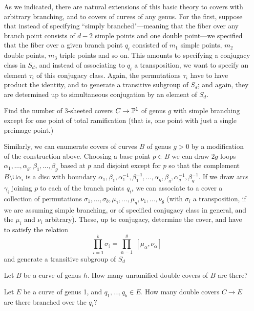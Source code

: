 As we indicated, there are natural extensions of this basic theory to covers with arbitrary branching, and to covers of curves of any genus. For the first, suppose that instead of specifying ``simply branched"---meaning that the fiber over any branch point consists of $d-2$ simple points and one double point---we specified that the fiber over a given branch point $q_i$ consisted of $m_1$ simple points, $m_2$ double points, $m_3$ triple points and so on. This amounts to specifying a conjugacy class in $S_d$, and instead of associating to $q_i$ a transposition, we want to specify an element $\tau_i$ of this conjugacy class. Again, the permutations $\tau_i$ have to have product the identity, and to generate a transitive subgroup of $S_d$; and again, they are determined up to simultaneous conjugation by an element of $S_d$.

\begin{exercise}
Find the number of 3-sheeted covers $C \to \PP^1$ of genus $g$ with simple branching except for one point of total ramification (that is, one point with just a single preimage point.)
\end{exercise}

Similarly, we can enumerate covers of curves $B$ of genus $g>0$ by a modification of the construction above. Choosing a base point $p \in B$ we can draw $2g$ loops $\alpha_1,\dots,\alpha_{g},\beta_1, \dots, \beta_g$ based at $p$ and disjoint except for $p$ so that the complement $B \setminus \cup \alpha_i$ is a disc with boundary $\alpha_1, \beta_1, \alpha_1^{-1}, \beta_1^{-1}, \dots, \alpha_g, \beta_g, \alpha_g^{-1}, \beta_g^{-1}$. If we draw arcs $\gamma_i$ joining $p$ to each of the branch points $q_i$, we can associate to a cover a collection of permutations $\sigma_1, \dots, \sigma_b, \mu_1,\dots,\mu_g, \nu_1,\dots,\nu_g$ (with $\sigma_i$ a transposition, if we are assuming simple branching, or of specified conjugacy class in general, and the $\mu_i$ and $\nu_i$ arbitrary). These, up to conjugacy, determine the cover, and have to satisfy the relation
$$
\prod_{i=1}^b \sigma_i = \prod_{\alpha=1}^g \; [\mu_\alpha, \nu_\alpha]
$$
and generate a transitive subgroup of $S_d$

\begin{exercise}
Let $B$ be a curve of genus $h$. How many unramified double covers of $B$ are there? 
\end{exercise}


\begin{exercise} Let $E$ be a curve of genus 1, and $q_1,\dots,q_b \in E$. How many double covers $C \to E$ are there branched over the $q_i$?
\end{exercise}


